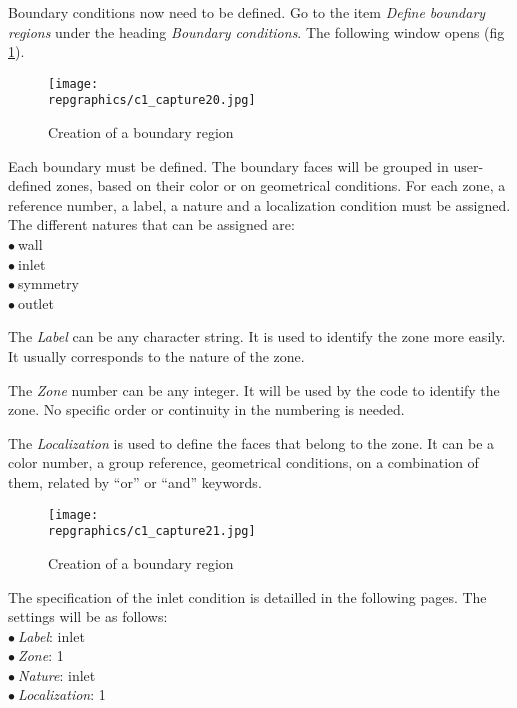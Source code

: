 \clearpage
Boundary conditions now need to be defined. Go to the item {\itshape Define
boundary regions} under the heading {\itshape Boundary conditions}.
The following window opens (fig \ref{fig20_e1}).

\begin{figure}[ht]
\begin{center}
\texttt{[image: \\repgraphics/c1\_capture20.jpg]}
\caption{Creation of a boundary region}
\label{fig20_e1}
\end{center}
\end{figure}


\clearpage
Each boundary must be defined. The boundary faces will be grouped in
user-defined zones, based on their color or on geometrical conditions. For each
zone, a reference number, a label, a nature and a localization condition must be
assigned.
The different natures that can be assigned are:\\
\hspace*{1cm}$\bullet\ $wall\\
\hspace*{1cm}$\bullet\ $inlet\\
\hspace*{1cm}$\bullet\ $symmetry\\
\hspace*{1cm}$\bullet\ $outlet

The {\itshape Label} can be any character string. It is used to identify the
zone more easily. It usually corresponds to the nature of the zone.

The {\itshape Zone} number can be any integer. It will be used by the code to
identify the zone. No specific order or continuity in the numbering is needed.

The {\itshape Localization} is used to define the faces that belong to the
zone. It can be a color number, a group reference, geometrical conditions, on a
combination of them, related by ``or'' or ``and'' keywords.

\begin{figure}[ht]
\begin{center}
\texttt{[image: \\repgraphics/c1\_capture21.jpg]}
\caption{Creation of a boundary region}
\label{fig21_e1}
\end{center}
\end{figure}


\clearpage
The specification of the inlet condition is detailled in the following
pages. The settings will be as follows:\\
\hspace*{1cm}$\bullet\ ${\itshape Label}: inlet\\
\hspace*{1cm}$\bullet\ ${\itshape Zone}: 1\\
\hspace*{1cm}$\bullet\ ${\itshape Nature}: inlet\\
\hspace*{1cm}$\bullet\ ${\itshape Localization}: 1


